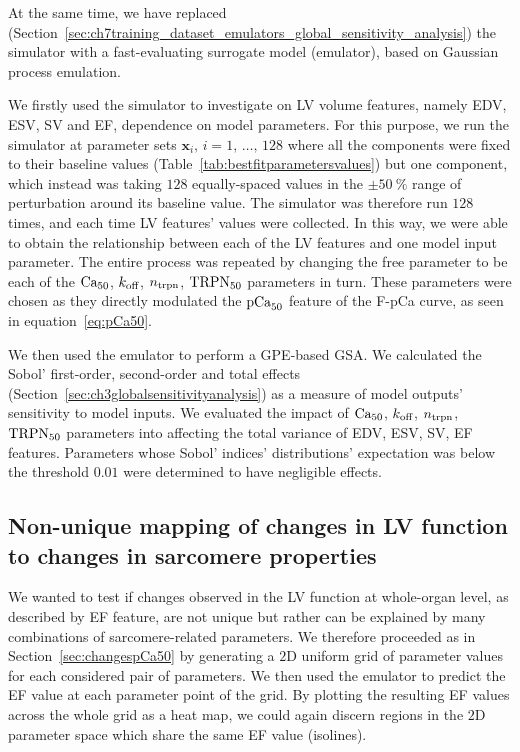 \vspace{0.2cm}\noindent
At the same time, we have replaced (Section~\ref{sec:ch7training_dataset_emulators_global_sensitivity_analysis}) the simulator with a fast-evaluating surrogate model (emulator), based on Gaussian process emulation.

\vspace{0.2cm}
We firstly used the simulator to investigate on LV volume features, namely EDV, ESV, SV and EF, dependence on model parameters. For this purpose, we run the simulator at parameter sets $\mathbf{x}_i,\,i=1,\,\dots,\,128$ where all the components were fixed to their baseline values (Table~\ref{tab:bestfitparametersvalues}) but one component, which instead was taking $128$ equally-spaced values in the $\pm\SI{50}{\percent}$ range of perturbation around its baseline value. The simulator was therefore run $128$ times, and each time LV features' values were collected. In this way, we were able to obtain the relationship between each of the LV features and one model input parameter. The entire process was repeated by changing the free parameter to be each of the $\textrm{Ca}_{50}$, $k_{\textrm{off}}$, $n_{\textrm{trpn}}$, $\textrm{TRPN}_{50}$ parameters in turn. These parameters were chosen as they directly modulated the $\textrm{pCa}_{50}$ feature of the F-pCa curve, as seen in equation~\eqref{eq:pCa50}.

\vspace{0.2cm}
We then used the emulator to perform a GPE-based GSA. We calculated the Sobol' first-order, second-order and total effects (Section~\ref{sec:ch3globalsensitivityanalysis}) as a measure of model outputs' sensitivity to model inputs. We evaluated the impact of $\textrm{Ca}_{50}$, $k_{\textrm{off}}$, $n_{\textrm{trpn}}$, $\textrm{TRPN}_{50}$ parameters into affecting the total variance of EDV, ESV, SV, EF features. Parameters whose Sobol' indices' distributions' expectation was below the threshold $0.01$ were determined to have negligible effects.


%
%
%
\subsection{Non-unique mapping of changes in LV function to changes in sarcomere properties}\label{sec:changesLVfunction}
We wanted to test if changes observed in the LV function at whole-organ level, as described by EF feature, are not unique but rather can be explained by many combinations of sarcomere-related parameters. We therefore proceeded as in Section~\ref{sec:changespCa50} by generating a $2$D uniform grid of parameter values for each considered pair of parameters. We then used the emulator to predict the EF value at each parameter point of the grid. By plotting the resulting EF values across the whole grid as a heat map, we could again discern regions in the $2$D parameter space which share the same EF value (isolines).


